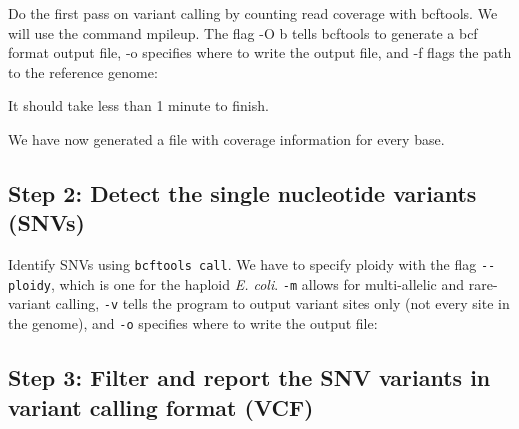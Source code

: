 \documentclass[
  letterpaper,
  DIV=11,
  numbers=noendperiod]{scrreprt}
\newenvironment{Shaded}{\begin{snugshade}}{\end{snugshade}}
\newcommand{\AttributeTok}[1]{\textcolor[rgb]{0.40,0.45,0.13}{#1}}
\newcommand{\DataTypeTok}[1]{\textcolor[rgb]{0.68,0.00,0.00}{#1}}
\newcommand{\ExtensionTok}[1]{\textcolor[rgb]{0.00,0.23,0.31}{#1}}
\newcommand{\NormalTok}[1]{\textcolor[rgb]{0.00,0.23,0.31}{#1}}
\begin{document}
Do the first pass on variant calling by counting read coverage with
bcftools. We will use the command mpileup. The flag -O b tells bcftools
to generate a bcf format output file, -o specifies where to write the
output file, and -f flags the path to the reference genome:

\begin{Shaded}
\end{Shaded}

It should take less than 1 minute to finish.

We have now generated a file with coverage information for every base.

\hypertarget{step-2-detect-the-single-nucleotide-variants-snvs}{%
\subsection{Step 2: Detect the single nucleotide variants
(SNVs)}\label{step-2-detect-the-single-nucleotide-variants-snvs}}

Identify SNVs using \texttt{bcftools\ call}. We have to specify ploidy
with the flag \texttt{-\/-ploidy}, which is one for the haploid \emph{E.
coli}. \texttt{-m} allows for multi-allelic and rare-variant calling,
\texttt{-v} tells the program to output variant sites only (not every
site in the genome), and \texttt{-o} specifies where to write the output
file:

\begin{Shaded}
\end{Shaded}

\hypertarget{step-3-filter-and-report-the-snv-variants-in-variant-calling-format-vcf}{%
\subsection{Step 3: Filter and report the SNV variants in variant
calling format
(VCF)}\label{step-3-filter-and-report-the-snv-variants-in-variant-calling-format-vcf}}
\end{document}
